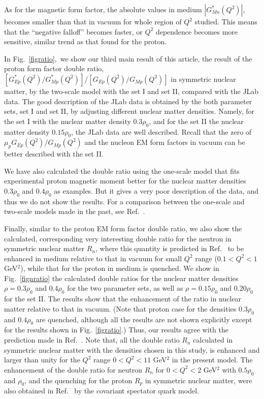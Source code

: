 \documentclass[preprint,aps,showpacs,floatfix]{revtex4}
\begin{document}
As for the magnetic form factor, the absolute values in medium $|G^*_{Mn}(Q^2)|$, 
becomes smaller than that in vacuum for whole region of $Q^2$ studied.
This means that the ``negative falloff'' becomes faster, or $Q^2$ dependence 
becomes more sensitive, similar trend as that found for the proton.


In Fig.~\ref{figratio},~we show our third main result of this article, 
the result of the proton form factor double ratio, 
$[G^*_{Ep}(Q^2)/G^*_{Mp}(Q^2)]/[G_{Ep}(Q^2)/G_{Mp}(Q^2)]$ in symmetric nuclear matter,   
by the two-scale model with the set I and set II, compared with the JLab data. 
The good description of the JLab data is obtained by the both parameter sets, set I and set II, 
by adjusting different nuclear matter densities.
Namely, for the set I with the nuclear matter density $0.3 \rho_0$, and for the set II 
the nuclear matter density $0.15 \rho_0$, the JLab data are well described.
Recall that the zero of $\mu_pG_{Ep}(Q^2)/G_{Mp}(Q^2)$ and the 
nucleon EM form factors in vacuum can be better described with the set II.  

We have also calculated the double ratio using the one-scale model that fits experimental 
proton magnetic moment better for the nuclear matter densities $0.3 \rho_0$ and $0.4 \rho_0$ as examples.  
But it gives a very poor description of the data, and thus we do not show the results. 
For a comparison between the one-scale and two-scale models 
made in the past, see Ref.~\cite{Araujo2006}.

Finally, similar to the proton EM form factor double ratio, 
we also show the calculated, corresponding very interesting double ratio 
for the neutron in symmetric nuclear matter $R_n$, 
where this quantity is predicted in Ref.~\cite{Cloet} to be 
enhanced in medium relative to that in vacuum for small $Q^2$ range 
($0.1 < Q^2 < 1$ GeV$^2$), while that for the proton in medium is quenched.
We show in Fig.~\ref{fignratio}
the calculated double ratios for the nuclear matter densities $\rho = 0.3 \rho_0$ 
and $0.4 \rho_0$ for the two parameter sets, 
as well as $\rho = 0.15 \rho_0$ and $0.20 \rho_0$ for the set II. 
The results show that the enhancement of the ratio in nuclear matter 
relative to that in vacuum. (Note that proton case for the densities $0.3 \rho_0$ 
and $0.4 \rho_0$ are quenched, although all the results are not shown explicitly 
except for the results shown in Fig.~\ref{figratio}.)
Thus, our results agree with the prediction made in Ref.~\cite{Cloet}.
Note that, all the double ratio $R_n$ calculated in symmetric nuclear matter 
with the densities chosen in this study, is enhanced and larger than unity 
for the $Q^2$ range $0 < Q^2 < 11$ GeV$^2$ in the present model.
The enhancement of the double ratio for neutron $R_n$ 
for $0 < Q^2 < 2$ GeV$^2$ with $0.5 \rho_0$ and $\rho_0$,   
and the quenching for the proton $R_p$ in symmetric nuclear matter, 
were also obtained in Ref.~\cite{Gilberto} by the covariant 
spectator quark model.
\end{document}
